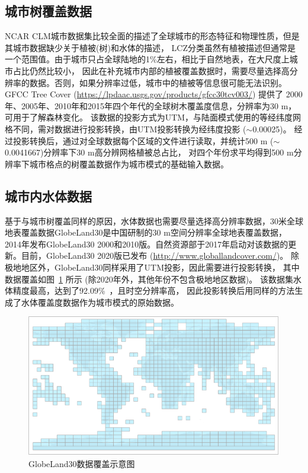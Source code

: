 \subsection{城市树覆盖数据}\label{城市树覆盖数据}
NCAR CLM城市数据集比较全面的描述了全球城市的形态特征和物理性质，但是其城市数据缺少关于植被(树)和水体的描述，
LCZ分类虽然有植被描述但通常是一个范围值。由于城市只占全球陆地的1\%左右，相比于自然地表，在大尺度上城市占比仍然比较小，
因此在补充城市内部的植被覆盖数据时，需要尽量选择高分辨率的数据。否则，如果分辨率过低，城市中的植被等信息很可能无法识别。
GFCC Tree Cover (\url{https://lpdaac.usgs.gov/products/gfcc30tcv003/}) 提供了
2000年、2005年、2010年和2015年四个年代的全球树木覆盖度信息，分辨率为30 m，可用于了解森林变化。
该数据的投影方式为UTM，与陆面模式使用的等经纬度网格不同，需对数据进行投影转换，由UTM投影转换为经纬度投影 ($\sim$0.00025\textdegree)。
经过投影转换后，通过对全球数据每个区域的文件进行读取，并统计500 m ($\sim$0.0041667\textdegree)分辨率下30 m高分辨网格植被总占比，
对四个年份求平均得到500 m分辨率下城市格点的树覆盖数据作为城市模式的基础输入数据。


\subsection{城市内水体数据}\label{城市内水体数据}
基于与城市树覆盖同样的原因，水体数据也需要尽量选择高分辨率数据，30米全球地表覆盖数据GlobeLand30是中国研制的30 m空间分辨率全球地表覆盖数据，
2014年发布GlobeLand30 2000和2010版。自然资源部于2017年启动对该数据的更新。目前，GlobeLand30 2020版已发布 (\url{http://www.globallandcover.com/})。
除极地地区外，GlobeLand30同样采用了UTM投影，因此需要进行投影转换，
其中数据覆盖如图~\ref{fig:GlobeLand30数据覆盖示意图} 所示 (除2020年外，其他年份不包含极地地区数据)。
该数据集水体精度最高，达到了92.09\%~\citep{陈军2017}，且时空分辨率高，
因此投影转换后用同样的方法生成了水体覆盖度数据作为城市模式的原始数据。

{
\begin{figure}[htbp]
\centering
\includegraphics{Figures/基础数据/GlobeLand30数据覆盖示意图.png}
\caption{GlobeLand30数据覆盖示意图}
\label{fig:GlobeLand30数据覆盖示意图}
\end{figure}
}


